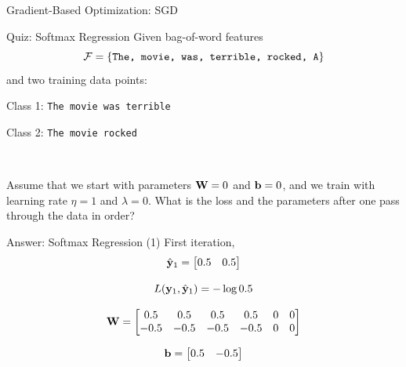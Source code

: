 \documentclass{beamer}
\begin{document}
\begin{frame}{Gradient-Based Optimization: SGD}
  \begin{figure}
    \begin{algorithmic}
      \State{$\theta \gets \theta - \eta \hat{\boldg}$}
      \EndWhile{}
      \State{\Return{$\theta$}}
      \EndProcedure{}
    \end{algorithmic}
  \end{figure}
\end{frame}


\begin{frame}{Quiz: Softmax Regression}
  Given bag-of-word features \[\mathcal{F} = \{\mathrm{\texttt{The, movie, was, terrible, rocked, A}} \}\] and two training data points:
    
  \begin{center}
    Class 1: \texttt{The movie was terrible}
  
    Class 2: \texttt{The movie rocked}
  \end{center}
  \\

  \air 

  Assume that we start with parameters $\mathbf{W} = 0$ and $\mathbf{b} = 0$,
  and we train with learning rate $\eta = 1$ and $\lambda = 0$. What is
  the loss and the parameters after one pass through the data in order?
\end{frame}

\begin{frame}{Answer: Softmax Regression (1) }
  First iteration,
  \[\hat{\mathbf{y}}_1 = \begin{bmatrix} 0.5 & 0.5 \end{bmatrix}\]

  \[ L(\mathbf{y}_1, \hat{\mathbf{y}}_1) = - \log 0.5 \]

  \[ \mathbf{W} =
  \begin{bmatrix}
    0.5 & 0.5 & 0.5 & 0.5 & 0 & 0 \\
    -0.5 & -0.5 & -0.5 & -0.5 & 0 & 0 \\
  \end{bmatrix}
  \]

  
  \[ \mathbf{b} =
  \begin{bmatrix}
    0.5 & -0.5 \\
  \end{bmatrix} \]
\end{frame}
\end{document}

